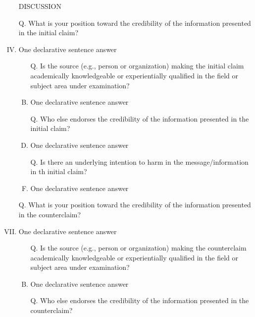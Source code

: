 \documentclass[a4paper, 12pt]{article}
\begin{document}
\begin{enumerate}[I.]
    \item [] %
    \item [] DISCUSSION
    \item [Q.] What is your position toward the credibility of the information presented in the {\color{blue}initial claim}?
    \item {\color{gray} One declarative sentence answer} %
          \begin{enumerate}[A.]
              \item [Q.] Is the source (e.g., person or organization) making the {\color{blue}initial claim} academically knowledgeable
                    or experientially qualified in the field or subject area under examination?
              \item {\color{gray} One declarative sentence answer} %
              \item [Q.] Who else endorses the credibility of the information presented in the {\color{blue}initial claim}?
              \item {\color{gray} One declarative sentence answer}
              \item [Q.] Is there an underlying intention to harm in the message/information in th {\color{blue}initial claim}?
              \item {\color{gray} One declarative sentence answer}
          \end{enumerate}
    \item []
    \item [Q.] What is your position toward the credibility of the information presented in the {\color{red} counterclaim}?
    \item {\color{gray} One declarative sentence answer} %
          \begin{enumerate}[A.]
              \item [Q.] Is the source (e.g., person or organization) making the {\color{red}counterclaim} academically knowledgeable
                    or experientially qualified in the field or subject area under examination?
              \item {\color{gray} One declarative sentence answer} %
              \item [Q.] Who else endorses the credibility of the information presented in the {\color{red}counterclaim}?

\end{enumerate}
\end{enumerate}
\end{document}
